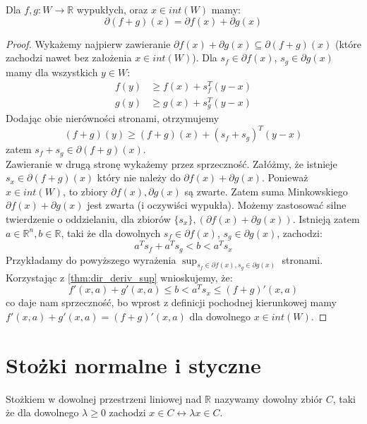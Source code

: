 \documentclass[10pt,a4paper,draft]{report}
\begin{document}
\begin{theorem}
Dla $f, g : W \rightarrow \mathbb{R}$ wypukłych, oraz $x \in int(W)$ mamy:
\[
\partial (f + g) (x) = \partial f(x) + \partial g(x)
\] 
\end{theorem}
\begin{proof}
Wykażemy najpierw zawieranie $\partial f(x) + \partial g(x) \subseteq \partial (f+g) (x)$  (które zachodzi nawet bez założenia $x \in int(W)$). Dla $s_f \in \partial f(x)$, $s_g \in \partial g(x)$ mamy dla wszystkich $y \in W$:
\[
\begin{aligned}
f(y) & \geq f(x) + s_f^T (y - x) \\
g(y) & \geq g(x) + s_g^T (y - x)
\end{aligned}
\]
Dodając obie nierówności stronami, otrzymujemy
\[
(f + g)(y) \geq (f+g)(x) + (s_f + s_g)^T(y - x)
\]
zatem $s_f + s_g \in \partial (f+g)(x)$. \\
Zawieranie w drugą stronę wykażemy przez sprzeczność. Załóżmy, że istnieje $s_x \in \partial (f+g)(x)$ który nie należy do $\partial f(x) + \partial g(x)$. Ponieważ $x \in int(W)$, to zbiory $\partial f(x), \partial g(x)$ są zwarte. Zatem suma Minkowskiego $\partial f(x) + \partial g(x)$ jest zwarta (i oczywiści wypukła). Możemy zastosować silne twierdzenie o oddzielaniu, dla zbiorów $\{s_x\}, (\partial f(x) + \partial g(x))$. Istnieją zatem $a \in \mathbb{R}^n, b \in \mathbb{R}$, taki że dla dowolnych $s_f \in \partial f(x)$, $s_g \in \partial g(x)$, zachodzi:
\[
a^T s_f + a^T s_g < b < a^T s_x 
\]
Przykładamy do powyższego wyrażenia $\sup_{s_f \in \partial f(x), s_g \in \partial g(x)}$ stronami. Korzystając z  \ref{thm:dir_deriv_sup} wnioskujemy, że:
\[
f'(x,a) + g'(x, a) \leq b < a^T s_x \leq (f+g)'(x, a)
\]
co daje nam sprzeczność, bo wprost z definicji pochodnej kierunkowej mamy $f'(x, a) + g'(x,a) = (f+g)'(x,a)$ dla dowolnego $x \in int(W)$.

\end{proof}


\section{Stożki normalne i styczne}

\begin{definition}[Stożka] Stożkiem w dowolnej przestrzeni liniowej nad $\mathbb{R}$ nazywamy dowolny zbiór $C$, taki że dla dowolnego $\lambda \geq 0$ zachodzi $x \in C \leftrightarrow \lambda x \in C$.
\end{definition}
\end{document}
